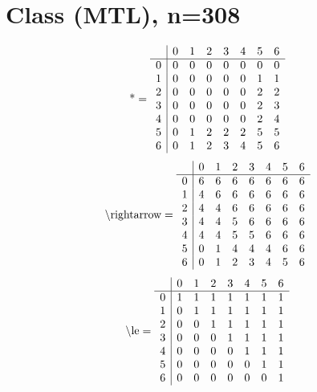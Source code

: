 \documentclass[11pt]{article}
\begin{document}
\section{Class (MTL), n=308}
\[\text{*} = 
\begin{array}{r | r r r r r r r}
 & 0 & 1 & 2 & 3 & 4 & 5 & 6 \\ \hline
0 & 0 & 0 & 0 & 0 & 0 & 0 & 0 \\
1 & 0 & 0 & 0 & 0 & 0 & 1 & 1 \\
2 & 0 & 0 & 0 & 0 & 0 & 2 & 2 \\
3 & 0 & 0 & 0 & 0 & 0 & 2 & 3 \\
4 & 0 & 0 & 0 & 0 & 0 & 2 & 4 \\
5 & 0 & 1 & 2 & 2 & 2 & 5 & 5 \\
6 & 0 & 1 & 2 & 3 & 4 & 5 & 6 \\
\end{array}
\]
\[\text{\textbackslash rightarrow} = 
\begin{array}{r | r r r r r r r}
 & 0 & 1 & 2 & 3 & 4 & 5 & 6 \\ \hline
0 & 6 & 6 & 6 & 6 & 6 & 6 & 6 \\
1 & 4 & 6 & 6 & 6 & 6 & 6 & 6 \\
2 & 4 & 4 & 6 & 6 & 6 & 6 & 6 \\
3 & 4 & 4 & 5 & 6 & 6 & 6 & 6 \\
4 & 4 & 4 & 5 & 5 & 6 & 6 & 6 \\
5 & 0 & 1 & 4 & 4 & 4 & 6 & 6 \\
6 & 0 & 1 & 2 & 3 & 4 & 5 & 6 \\
\end{array}
\]
\[\text{\textbackslash le} = 
\begin{array}{r | r r r r r r r}
 & 0 & 1 & 2 & 3 & 4 & 5 & 6 \\ \hline
0 & 1 & 1 & 1 & 1 & 1 & 1 & 1 \\
1 & 0 & 1 & 1 & 1 & 1 & 1 & 1 \\
2 & 0 & 0 & 1 & 1 & 1 & 1 & 1 \\
3 & 0 & 0 & 0 & 1 & 1 & 1 & 1 \\
4 & 0 & 0 & 0 & 0 & 1 & 1 & 1 \\
5 & 0 & 0 & 0 & 0 & 0 & 1 & 1 \\
6 & 0 & 0 & 0 & 0 & 0 & 0 & 1 \\
\end{array}
\]
\end{document}

